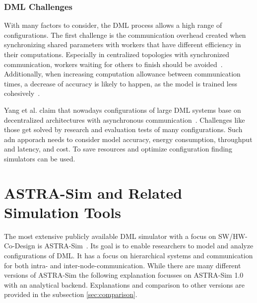 

\subsubsection*{DML Challenges}
\label{sec:discussion}
With many factors to consider, the \ac{DML} process allows a high range of configurations.
The first challenge is the communication overhead created when synchronizing shared parameters with workers that have different efficiency in their computations. 
Especially in centralized topologies with synchronized communication, workers waiting for others to finish should be avoided~\cite{sze_hardware_2017}. 
Additionally, when increasing computation allowance between communication times, a decrease of accuracy is likely to happen, as the model is trained less cohesively~\cite{yang_balancing_2025}.

Yang et al. claim that nowadays configurations of large \ac{DML} systems base on decentralized architectures with asynchronous communication~\cite{yang_balancing_2025}. 
Challenges like those get solved by research and evaluation tests of many configurations. Such adn apporach needs to consider model accuracy, energy consumption, throughput and latency, and cost\cite{lee_model_2014}. To save resources and optimize configuration finding simulators can be used.

\section{ASTRA-Sim and Related Simulation Tools}



The most extensive publicly available \ac{DML} simulator with a focus on \ac{SW}/\ac{HW}-Co-Design is \ac{ASTRA-Sim}~\cite{rashidi_astra-sim_2020}.  
Its goal is to enable researchers to model and analyze configurations of \ac{DML}. It has a focus on hierarchical systems and communication for both intra- and inter-node-communication.
While there are many different versions of \ac{ASTRA-Sim} the following explanation focusses on \ac{ASTRA-Sim} 1.0 with an analytical backend. Explanations and comparison to other versions are provided in the subsection \ref{sec:comparison}.


